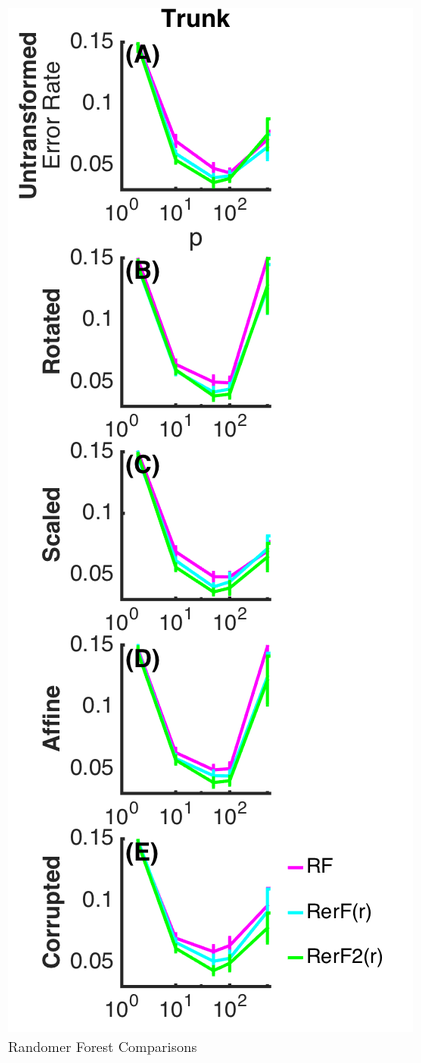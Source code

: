 \documentclass[simplex.tex]{subfiles}
\begin{document}
\begin{figure}[h!]
\begin{cframed}
\includegraphics[height=0.5\textheight]{../../figs/RefF2.png}
\caption{
 Randomer Forest Comparisons
}
\label{fig:RefF1}
\end{cframed}
\end{figure}
\end{document}

